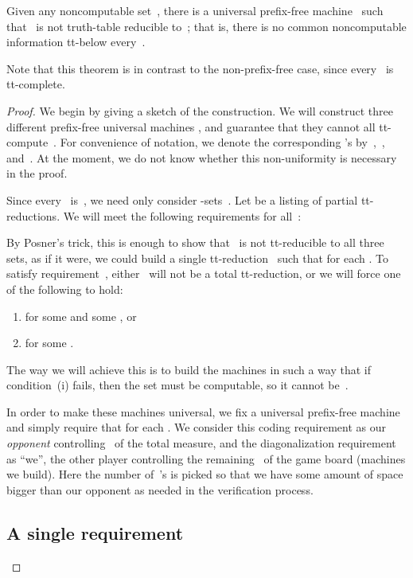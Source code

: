 \documentclass{LMCS}
\newcommand{\0}{\mathbf{0}}
\newcommand{\<}{\langle}
\renewcommand{\>}{\rangle}
\begin{document}
\begin{thm}\label{knight-bishop}
Given any noncomputable set~, there is a universal prefix-free
machine~ such that~ is not truth-table reducible to~; that
is, there is no common noncomputable information tt-below every~.
\end{thm}

Note that this theorem is in contrast to the non-prefix-free case, since
every~ is tt-complete.

\begin{proof}We begin by giving a sketch of the construction. We will construct three
different prefix-free universal machines , and guarantee
that they cannot all tt-compute~. For convenience of notation, we denote
the corresponding 's by~,~, and~. At the moment, we
do not know whether this non-uniformity is necessary in the proof.

Since every~ is~, we need only consider
-sets~.  Let  be a listing of
partial tt-reductions.  We will meet the following requirements for all~:

By Posner's trick, this is enough to show that~ is not tt-reducible to all
three sets, as if it were, we could build a single tt-reduction~ such
that  for each .  To satisfy
requirement~, either~ will not be a total
tt-reduction, or we will force one of the following to hold:

\begin{enumerate}[label=(\roman*)]
\item  for some  and
some , or
\item  for some .
\end{enumerate}
The way we will achieve this is to build the machines in such a way that if
condition~(i) fails, then the set  must be computable, so it
cannot be~.

In order to make these machines universal, we fix a universal prefix-free
machine~ and simply require that  for
each . We consider this coding requirement as our \emph{opponent}
controlling~ of the total measure, and the diagonalization requirement
as ``we'', the other player controlling the remaining~ of the game board
(machines we build). Here the number of~'s is picked so that we have
some amount of space bigger than our opponent as needed in the verification
process.

\subsection{A single requirement \texorpdfstring{}{R0}}


\end{proof}
\end{document}
